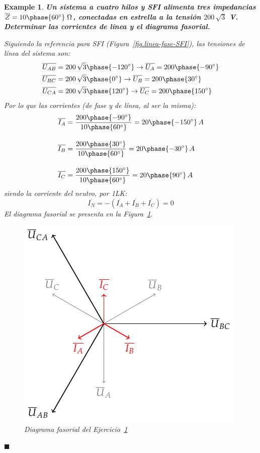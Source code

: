 \documentclass[11pt]{book} %
\numberwithin{dummy}{section}
\theoremstyle{ocrenumbox}
\theoremstyle{blacknumex}
\newtheorem{exampleT}{Example}[chapter]
\theoremstyle{blacknumbox}
\theoremstyle{ocrenum}
\newenvironment{example}{\begin{exampleT}}{\hfill{\tiny\ensuremath{\blacksquare}}\end{exampleT}}
\begin{document}
    \vspace{4mm}
    \begin{example}\label{ej.3-1}
	    \textbf{Un sistema a cuatro hilos y SFI alimenta tres impedancias $\overline{Z}=10\phase{60^\circ}\;\Omega$, conectadas en estrella a la tensión $200\,\sqrt{3}$ V. Determinar las corrientes de línea y el diagrama fasorial.}
	    
	    Siguiendo la referencia para SFI (Figura~\ref{fig.linea-fase-SFI}), las tensiones de línea del sistema son:
	    \begin{align*}
	        \overline{U_{AB}}&=200\,\sqrt{3}\phase{-120^\circ}\rightarrow \overline{U_A}=200\phase{-90^\circ}\\
	        \overline{U_{BC}}&=200\,\sqrt{3}\phase{0^\circ}\rightarrow \overline{U_B}=200\phase{30^\circ}\\
	        \overline{U_{CA}}&=200\,\sqrt{3}\phase{120^\circ}\rightarrow \overline{U_C}=200\phase{150^\circ}
	    \end{align*}
	    Por lo que las corrientes (de fase y de línea, al ser la misma):
	    \begin{align*}
	        \overline{I_A} &= \frac{200\phase{-90^\circ}}{10\phase{60^\circ}} =20\phase{-150^\circ} \,A \\[10pt]
          \overline{I_B} &= \frac{200\phase{30^\circ}}{10\phase{60^\circ}} = 20\phase{-30^\circ} \,A\\[10pt]
          \overline{I_C} &=\frac{200\phase{150^\circ}}{10\phase{60^\circ}} = 20\phase{90^\circ} \,A
	    \end{align*}
	    siendo la corriente del neutro, por 1LK:
	    \begin{equation*}
	        \overline{I_N}=-(\overline{I_A}+\overline{I_B}+\overline{I_C})=0
	    \end{equation*}
	    El diagrama fasorial se presenta en la Figura~\ref{fig.diagrama_ejemplo_3-1}. 
	    \begin{figure}[htbp]
	        \centering
	        \includegraphics[width=0.4\linewidth]{../figs/diagrama_ejemplo3_1.pdf}
	        \caption{Diagrama fasorial del Ejercicio~\ref{ej.3-1}}
	        \label{fig.diagrama_ejemplo_3-1}
	    \end{figure}
	\end{example}
	
\end{document}
